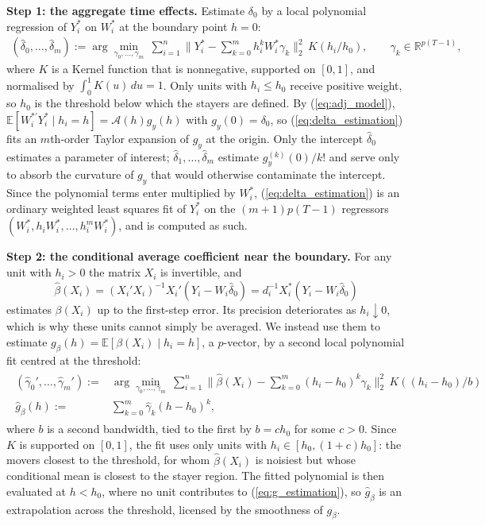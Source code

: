 \documentclass{article}
\newcommand{\normm}[1]{\lVert#1\rVert}
\newcommand{\E}{\mathbb{E}}
\newcommand{\R}{\mathbb{R}}
\begin{document}
\medskip\noindent
\textbf{Step 1: the aggregate time effects.}
Estimate $\delta_0$ by a local polynomial regression of $Y_i^{*}$ on $W_i^{*}$ at the boundary point $h=0$:
\begin{align}\label{eq:delta_estimation}
    (\hat{\delta}_0,\dots,\hat{\delta}_{m}):=\arg\min_{\gamma_0,\dots,\gamma_m}\ \sum_{i=1}^n \normm{Y_i^{*}-\sum_{k=0}^m h_i^k W_i^{*} \gamma_k}_2^2\, K(h_i/h_0),
    \qquad \gamma_k\in\R^{p(T-1)},
\end{align}
where $K$ is a Kernel function that is nonnegative, supported on $[0,1]$, and normalised by $\int_0^1K(u)\,du=1$. Only units with $h_i\le h_0$ receive positive weight, so $h_0$ is the threshold below which the stayers are defined. By (\ref{eq:adj_model}), $\E[W_i^{*\prime}Y_i^{*}\mid h_i=h]=\mathcal{A}(h)g_y(h)$ with $g_y(0)=\delta_0$, so (\ref{eq:delta_estimation}) fits an $m$th-order Taylor expansion of $g_y$ at the origin. Only the intercept $\hat\delta_0$ estimates a parameter of interest; $\hat\delta_1,\dots,\hat\delta_m$ estimate $g_y^{(k)}(0)/k!$ and serve only to absorb the curvature of $g_y$ that would otherwise contaminate the intercept. Since the polynomial terms enter multiplied by $W_i^{*}$, (\ref{eq:delta_estimation}) is an ordinary weighted least squares fit of $Y_i^{*}$ on the $(m+1)p(T-1)$ regressors $(W_i^{*},h_iW_i^{*},\dots,h_i^mW_i^{*})$, and is computed as such.

\medskip\noindent
\textbf{Step 2: the conditional average coefficient near the boundary.}
For any unit with $h_i>0$ the matrix $X_i$ is invertible, and
\[
    \hat{\beta}(X_i) = (X_i'X_i)^{-1}X_i'\left(Y_i-W_i\hat{\delta}_0\right)=d_i^{-1}X_i^{*}\left(Y_i-W_i\hat\delta_0\right)
\]
estimates $\beta(X_i)$ up to the first-step error. Its precision deteriorates as $h_i\downarrow0$, which is why these units cannot simply be averaged. We instead use them to estimate $g_{\beta}(h)=\E[\beta(X_i)\mid h_i=h]$, a $p$-vector, by a second local polynomial fit centred at the threshold:
\begin{align}\label{eq:g_estimation}
\begin{aligned}
    (\hat{\gamma}_0',\dots,\hat{\gamma}_m'):=&\arg\min_{\gamma_0,\dots,\gamma_m}\ \sum_{i=1}^n \normm{\hat{\beta}(X_i)-\sum_{k=0}^m (h_i-h_0)^k \gamma_k}_2^2\, K\!\left((h_i-h_0)/b\right)\\
    \hat{g}_{\beta}(h) := &\sum_{k=0}^m \hat{\gamma}_k (h-h_0)^k,
\end{aligned}
\end{align}
where $b$ is a second bandwidth, tied to the first by $b=ch_0$ for some $c>0$. Since $K$ is supported on $[0,1]$, the fit uses only units with $h_i\in[h_0,(1+c)h_0]$: the movers closest to the threshold, for whom $\hat\beta(X_i)$ is noisiest but whose conditional mean is closest to the stayer region. The fitted polynomial is then evaluated at $h<h_0$, where no unit contributes to (\ref{eq:g_estimation}), so $\hat g_\beta$ is an extrapolation across the threshold, licensed by the smoothness of $g_\beta$.
\end{document}
